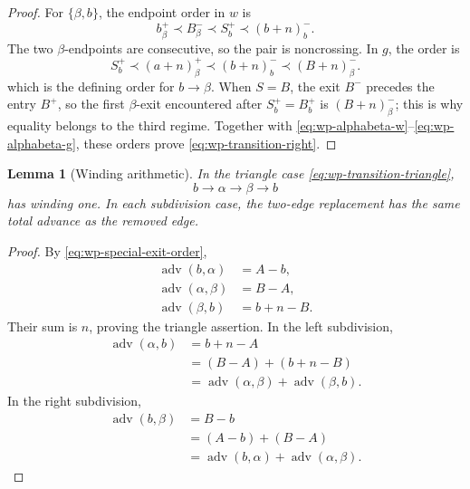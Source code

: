 \documentclass[11pt]{article}
\newtheorem{lemma}[theorem]{Lemma}
\theoremstyle{definition}
\begin{document}
\begin{proof}
For \(\{\beta,b\}\), the endpoint order in \(w\) is
\begin{equation}
   b_\beta^+
   \prec
   B_\beta^-
   \prec
   S_b^+
   \prec
   (b+n)_b^-.
   \label{eq:wp-right-betab-w}
\end{equation}
The two \(\beta\)-endpoints are consecutive, so the pair is noncrossing. In
\(g\), the order is
\begin{equation}
   S_b^+
   \prec
   (a+n)_\beta^+
   \prec
   (b+n)_b^-
   \prec
   (B+n)_\beta^-.
   \label{eq:wp-right-betab-g}
\end{equation}
which is the defining order for \(b\to\beta\). When \(S=B\), the exit
\(B^-\) precedes the entry \(B^+\), so the first \(\beta\)-exit encountered
after \(S_b^+=B_b^+\) is \((B+n)_\beta^-\); this is why equality belongs to
the third regime. Together with
\eqref{eq:wp-alphabeta-w}--\eqref{eq:wp-alphabeta-g}, these orders prove
\eqref{eq:wp-transition-right}.
\end{proof}

\begin{lemma}[Winding arithmetic]
\label{lem:wp-winding-arithmetic}
In the triangle case \eqref{eq:wp-transition-triangle},
\[
   b\to\alpha\to\beta\to b
\]
has winding one. In each subdivision case, the two-edge replacement has the
same total advance as the removed edge.
\end{lemma}

\begin{proof}
By \eqref{eq:wp-special-exit-order},
\[
\begin{aligned}
   \operatorname{adv}(b,\alpha)&=A-b,\\
   \operatorname{adv}(\alpha,\beta)&=B-A,\\
   \operatorname{adv}(\beta,b)&=b+n-B.
\end{aligned}
\]
Their sum is \(n\), proving the triangle assertion. In the left subdivision,
\[
\begin{aligned}
   \operatorname{adv}(\alpha,b)
   &=b+n-A\\
   &=(B-A)+(b+n-B)\\
   &=\operatorname{adv}(\alpha,\beta)
     +\operatorname{adv}(\beta,b).
\end{aligned}
\]
In the right subdivision,
\[
\begin{aligned}
   \operatorname{adv}(b,\beta)
   &=B-b\\
   &=(A-b)+(B-A)\\
   &=\operatorname{adv}(b,\alpha)
     +\operatorname{adv}(\alpha,\beta).
\end{aligned}
\]
\end{proof}
\end{document}
